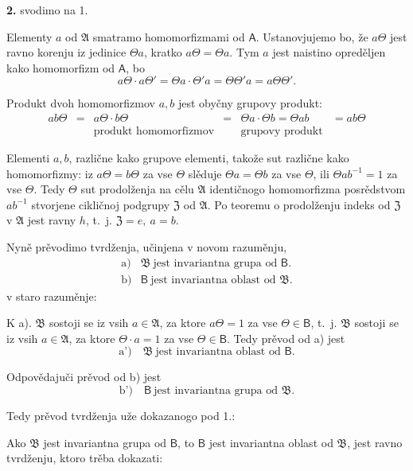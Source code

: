 \documentclass[11pt]{article}
\begin{document}
\textbf{2.} svodimo na 1.

Elementy \(a\) od \(\mathfrak A\) smatramo homomorfizmami od \(\mathsf A\). Ustanovjujemo bo, že \(a\Theta\) jest ravno korenju iz jedinice \(\Theta a\), kratko \(a\Theta=\Theta a\). Tym \(a\) jest naistino opreděljen kako homomorfizm od \(\mathsf A\), bo
\[
a\Theta\cdot a\Theta'=\Theta a\cdot\Theta' a=\Theta\Theta' a=a\Theta\Theta'.
\]

Produkt dvoh homomorfizmov \(a,b\) jest obyčny grupovy produkt:
\[
\begin{array}{cccccc}
ab\Theta&=&a\Theta\cdot b\Theta&=&\Theta a\cdot\Theta b=\Theta ab&=ab\Theta\\
&&\text{produkt homomorfizmov}&&\text{grupovy produkt}&
\end{array}
\]

Elementi \(a,b\), različne kako grupove elementi, takože sut različne kako homomorfizmy: iz \(a\Theta=b\Theta\) za vse \(\Theta\) slěduje \(\Theta a=\Theta b\) za vse \(\Theta\), ili \(\Theta ab^{-1}=1\) za vse \(\Theta\). Tedy \(\Theta\) sut prodolženja na cělu \(\mathfrak A\) identičnogo homomorfizma posrědstvom \(ab^{-1}\) stvorjene cikličnoj podgrupy \(\mathfrak Z\) od \(\mathfrak A\). Po teoremu o prodolženju indeks od \(\mathfrak Z\) v \(\mathfrak A\) jest ravny \(h\), t.~j. \(\mathfrak Z=e,\ a=b\).

Nyně prěvodimo tvrdženja, učinjena v novom razuměnju,
\[
\begin{array}{ll}
\text{a)}& \mathfrak B\ \text{jest invariantna grupa od }\mathsf B.\\
\text{b)}& \mathsf B\ \text{jest invariantna oblast od }\mathfrak B.
\end{array}
\]
v staro razuměnje:

K a). \(\mathfrak B\) sostoji se iz vsih \(a\in\mathfrak A\), za ktore \(a\Theta=1\) za vse \(\Theta\in\mathsf B\), t.~j. \(\mathfrak B\) sostoji se iz vsih \(a\in\mathfrak A\), za ktore \(\Theta\cdot a=1\) za vse \(\Theta\in\mathsf B\). Tedy prěvod od a) jest
\[
\text{a')} \quad \mathfrak B\ \text{jest invariantna oblast od }\mathsf B.
\]

Odpovědajuči prěvod od b) jest
\[
\text{b')} \quad \mathsf B\ \text{jest invariantna grupa od }\mathfrak B.
\]

Tedy prěvod tvrdženja uže dokazanogo pod 1.:

Ako \(\mathfrak B\) jest invariantna grupa od \(\mathsf B\), to \(\mathsf B\) jest invariantna oblast od \(\mathfrak B\),
jest ravno tvrdženju, ktoro trěba dokazati:
\end{document}
